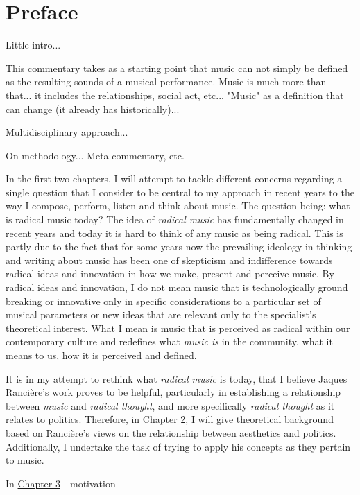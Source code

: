 \chapter{Preface}


Little intro... 

This commentary takes as a starting point that music can not simply be defined as the resulting sounds of a musical performance. Music is much more than that... it includes the relationships, social act, etc... "Music" as a definition that can change (it already has historically)...

Multidisciplinary approach...

On methodology... Meta-commentary, etc.

In the first two chapters, I will attempt to tackle different concerns regarding a single question that I consider to be central to my approach in recent years to the way I compose, perform, listen and think about music. The question being: what is radical music today? The idea of \emph{radical music} has fundamentally changed in recent years and today it is hard to think of any music as being radical. This is partly due to the fact that for some years now the prevailing ideology in thinking and writing about music has been one of skepticism and indifference towards radical ideas and innovation in how we make, present and perceive music. By radical ideas and innovation, I do not mean music that is technologically ground breaking or innovative only in specific considerations to a particular set of musical parameters or new ideas that are relevant only to the specialist's theoretical interest. What I mean is music that is perceived as radical within our contemporary culture and redefines what \emph{music is} in the community, what it means to us, how it is perceived and defined.

It is in my attempt to rethink what \emph{radical music} is today, that I believe Jaques Ranci\`{e}re's work proves to be helpful, particularly in establishing a relationship between \emph{music} and \emph{radical thought}, and more specifically \emph{radical thought} as it relates to politics. Therefore, in \hyperlink{chapter2}{Chapter 2}, I will give theoretical background based on Ranci\`{e}re's views on the relationship between aesthetics and politics. Additionally, I undertake the task of trying to apply his concepts as they pertain to music. 

In \hyperlink{chapter3}{Chapter 3}---motivation

